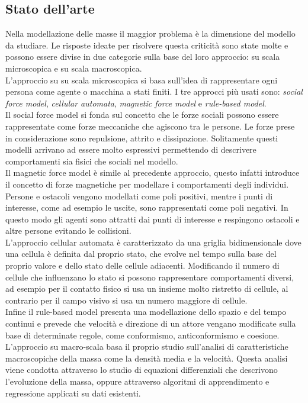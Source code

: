 \subsection{Stato dell'arte}
\label{subsec:stato-dell-arte}
Nella modellazione delle masse il maggior problema è la dimensione del modello da studiare. Le risposte ideate per risolvere questa criticità sono state molte e possono essere divise in due categorie sulla base del loro approccio: su scala microscopica e su scala macroscopica.\\
L'approccio su su scala microscopica si basa sull'idea di rappresentare ogni persona come agente o macchina a stati finiti. I tre approcci più usati sono: \textit{social force model}, \textit{cellular automata}, \textit{magnetic force model} e \textit{rule-based model}.\\
Il social force model \cite{helbing} si fonda sul concetto che le forze sociali possono essere rappresentate come forze meccaniche che agiscono tra le persone. Le forze prese in considerazione sono repulsione, attrito e dissipazione. Solitamente questi modelli arrivano ad essere molto espressivi permettendo di descrivere comportamenti sia fisici che sociali nel modello.\\
Il magnetic force model \cite{okazaki} è simile al precedente approccio, questo infatti introduce il concetto di forze magnetiche per modellare i comportamenti degli individui. Persone e ostacoli vengono modellati come poli positivi, mentre i punti di interesse, come ad esempio le uscite, sono rappresentati come poli negativi. In questo modo gli agenti sono attratti dai punti di interesse e respingono ostacoli e altre persone evitando le collisioni.\\
L'approccio cellular automata \cite{dijkstra} è caratterizzato da una griglia bidimensionale dove una cellula è definita dal proprio stato, che evolve nel tempo sulla base del proprio valore e dello stato delle cellule adiacenti. Modificando il numero di cellule che influenzano lo stato si possono rappresentare comportamenti diversi, ad esempio per il contatto fisico si usa un insieme molto ristretto di cellule, al contrario per il campo visivo si usa un numero maggiore di cellule.\\
Infine il rule-based model \cite{reynolds} presenta una modellazione dello spazio e del tempo continui e prevede che velocità e  direzione di un attore vengano modificate sulla base di determinate regole, come conformismo, anticonformismo e coesione.\\
L'approccio su macro-scala basa il proprio studio sull'analisi di caratteristiche macroscopiche della massa come la densità media e la velocità. Questa analisi viene condotta attraverso lo studio di equazioni differenziali che descrivono l'evoluzione della massa, oppure attraverso algoritmi di apprendimento e regressione applicati su dati esistenti. \\
